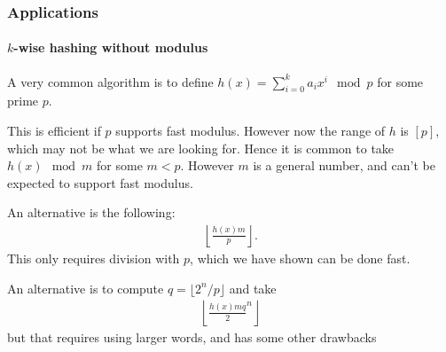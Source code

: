
\subsubsection{Applications}

\paragraph{$k$-wise hashing without modulus}

A very common algorithm is to define
$h(x) = \sum_{i=0}^k a_i x^i \mod p$
for some prime $p$.

This is efficient if $p$ supports fast modulus.
However now the range of $h$ is $[p]$, which may not be what we are looking for.
Hence it is common to take $h(x)\mod m$ for some $m<p$.
However $m$ is a general number, and can't be expected to support fast modulus.

An alternative is the following:
\begin{align}
   \left\lfloor\frac{h(x)m}{p}\right\rfloor.
\end{align}
This only requires division with $p$, which we have shown can be done fast.

An alternative is to compute $q = \lfloor2^n/p\rfloor$ and take
\begin{align}
\left\lfloor
   \frac{h(x)mq}2^n
\right\rfloor
\end{align}
but that requires using larger words, and has some other drawbacks
